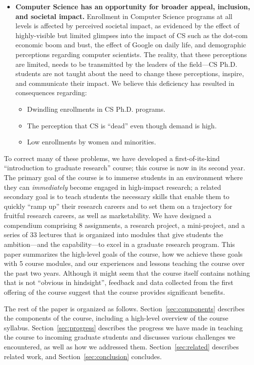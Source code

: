 \begin{itemize}
\item {\bf Computer Science has an opportunity for broader appeal,
  inclusion, and societal impact.}  Enrollment in Computer Science
  programs at all levels is affected by perceived societal impact, as
  evidenced by the effect of highly-visible but limited glimpses into
  the impact of CS such as the dot-com economic boom and bust, the
  effect of Google on daily life, and demographic perceptions
  regarding computer scientists.  The reality, that these perceptions
  are limited, needs to be transmitted by the leaders of the field---CS
  Ph.D. students are not taught about the need to change these
  perceptions, inspire, and communicate their impact.  We believe
  this deficiency has resulted in consequences regarding:
  \begin{itemize}
\itemsep=-1pt
  \item Dwindling enrollments in CS Ph.D. programs.
  \item The perception that CS is ``dead'' even though demand is high.
  \item Low enrollments by women and minorities.
  \end{itemize}
\end{itemize}

To correct many of these problems, we have developed a first-of-its-kind
``introduction to graduate research'' course; this course is now in its
second year.  The primary goal of the course is to immerse students in
an environment where they can {\em immediately} become engaged in
high-impact research; a related secondary goal is to teach students the
necessary skills that enable them to quickly ``ramp up'' their research
careers and to set them on a trajectory for fruitful research careers,
as well as marketability.  We have designed a compendium comprising 8
assignments, a research project, a mini-project, and a series of 33
lectures that is organized into modules that give students the
ambition---and the capability---to excel in a graduate research program.
This paper summarizes the high-level goals of the course, how we achieve
these goals with 5 course modules, and our experiences and lessons
teaching the course over the past two years.  Although it might seem
that the course itself contains nothing that is not ``obvious in
hindsight'', feedback and data collected from the first offering of the
course suggest that the course provides significant benefits.



The rest of the paper is organized as follows.
Section~\ref{sec:components} describes the components of the course,
including a high-level overview of the course syllabus.
Section~\ref{sec:progress} describes the progress we have made in
teaching the course to incoming graduate students and discusses various
challenges we encountered, as well as how we addressed them.
Section~\ref{sec:related} describes related work, and
Section~\ref{sec:conclusion} concludes.

